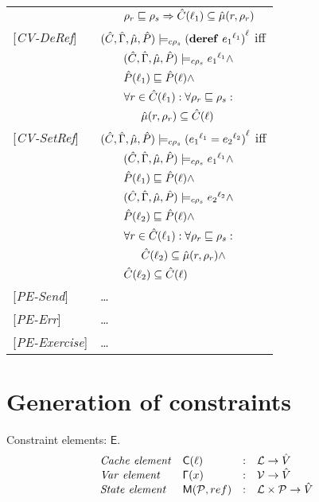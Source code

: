 \documentclass[[12pt,a4paper,twoside,openrigh]{report}
\begin{document}
\begin{tabular} {l l l l}
&&\multicolumn{2}{l}{$\rho_r \sqsubseteq \rho_s \Rightarrow \hat{C}(\ell_1) \subseteq \hat{\mu}(r, \rho_r) $}\\
{[\textit{CV-DeRef}]}&\multicolumn{3}{l}{$(\hat{C},\hat{\Gamma},\hat{\mu},\hat{P}) \models_{c \rho_s} {(\mathbf{deref}\ {e_1}^{\ell_1})}^{\ell} $ iff}\\
&&\multicolumn{2}{l}{$ (\hat{C},\hat{\Gamma},\hat{\mu},\hat{P}) \models_{c \rho_s} {e_1}^{\ell_1}\wedge $}\\
&&\multicolumn{2}{l}{$\hat{P}(\ell_1) \sqsubseteq \hat{P}(\ell) \wedge$}\\
&&\multicolumn{2}{l}{$\forall r \in \hat{C}(\ell_1) : \forall \rho_r \sqsubseteq \rho_s :$}\\
&&&$\hat{\mu}(r, \rho_r) \subseteq \hat{C}(\ell)$ \\
{[\textit{CV-SetRef}]}&\multicolumn{3}{l}{$(\hat{C},\hat{\Gamma},\hat{\mu},\hat{P}) \models_{c \rho_s} {({e_1}^{\ell_1} = {e_2}^{\ell_2})}^{\ell} $ iff}\\
&&\multicolumn{2}{l}{$ (\hat{C},\hat{\Gamma},\hat{\mu},\hat{P}) \models_{c \rho_s} {e_1}^{\ell_1} \wedge $}\\
&&\multicolumn{2}{l}{$ \hat{P}(\ell_1) \sqsubseteq \hat{P}(\ell) \wedge $}\\
&&\multicolumn{2}{l}{$ (\hat{C},\hat{\Gamma},\hat{\mu},\hat{P}) \models_{c \rho_s} {e_2}^{\ell_2} \wedge $}\\
&&\multicolumn{2}{l}{$ \hat{P}(\ell_2) \sqsubseteq \hat{P}(\ell) \wedge $}\\
&&\multicolumn{2}{l}{$ \forall r \in \hat{C}(\ell_1) : \forall \rho_r \sqsubseteq \rho_s :$}\\
&&&$\hat{C}(\ell_2) \subseteq \hat{\mu}(r, \rho_r) \wedge$ \\
&&\multicolumn{2}{l}{$\hat{C}(\ell_2) \subseteq \hat{C}(\ell) $} \\
{[\textit{PE-Send}]}& \dots \\
{[\textit{PE-Err}]}& \dots \\
{[\textit{PE-Exercise}]}& \dots \\
\end{tabular}

\section{Generation of constraints}
\newcommand{\genl}[1]{\mathcal{C}_{*\rho_s}\llbracket (#1)^\ell \rrbracket}
\newcommand{\gen}[1]{\mathcal{C}_{*\rho_s}\llbracket (#1) \rrbracket}
\newcommand{\Cel}{\mathsf{C}}
\newcommand{\Rel}{\mathsf{\Gamma}}
\newcommand{\Pel}{\mathsf{P}}
\newcommand{\Mel}{\mathsf{M}}
\newcommand{\El}{\mathsf{E}}
\newcommand{\braces}[1]{\{ #1 \} }
\newcommand{\parens}[1]{\( #1 \) }

Constraint elements: $\El$.
\[
\begin{array}{llcl}
\mathit{Cache\ element} & \Cel(\ell)& : & \labs \rightarrow \absvalues \\
\mathit{Var\ element} & \Rel(x) & : & \vars \rightarrow \absvalues \\
\mathit{State\ element} & \Mel(\perms, ref) & : & \labs \times \perms \rightarrow \absvalues \\
\end{array}
\]
\end{document}
